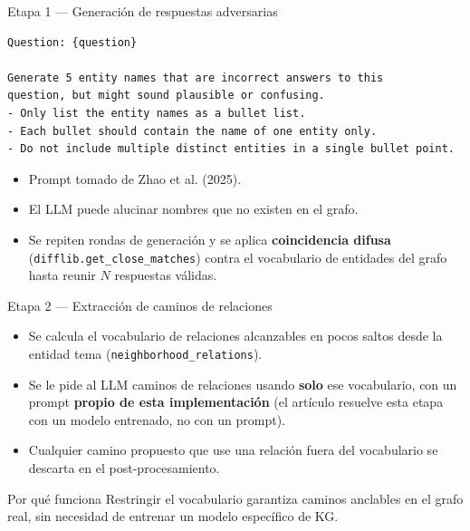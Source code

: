 \documentclass[aspectratio=169]{beamer}
\begin{document}
\begin{frame}[fragile]{Etapa 1 --- Generación de respuestas adversarias}
  \begin{lstlisting}
Question: {question}

Generate 5 entity names that are incorrect answers to this
question, but might sound plausible or confusing.
- Only list the entity names as a bullet list.
- Each bullet should contain the name of one entity only.
- Do not include multiple distinct entities in a single bullet point.
  \end{lstlisting}
  \begin{itemize}
    \item Prompt tomado de Zhao et al. (2025).
    \item El LLM puede alucinar nombres que no existen en el grafo.
    \item Se repiten rondas de generación y se aplica \textbf{coincidencia difusa}
      (\texttt{difflib.get\_close\_matches}) contra el vocabulario de entidades
      del grafo hasta reunir $N$ respuestas válidas.
  \end{itemize}
\end{frame}

\begin{frame}{Etapa 2 --- Extracción de caminos de relaciones}
  \begin{itemize}
    \item Se calcula el vocabulario de relaciones alcanzables en pocos saltos
      desde la entidad tema (\texttt{neighborhood\_relations}).
    \item Se le pide al LLM caminos de relaciones usando \textbf{solo} ese
      vocabulario, con un prompt \textbf{propio de esta implementación} (el
      artículo resuelve esta etapa con un modelo entrenado, no con un prompt).
    \item Cualquier camino propuesto que use una relación fuera del vocabulario
      se descarta en el post-procesamiento.
  \end{itemize}
  \begin{alertblock}{Por qué funciona}
    Restringir el vocabulario garantiza caminos anclables en el grafo real, sin
    necesidad de entrenar un modelo específico de KG.
  \end{alertblock}
\end{frame}
\end{document}
